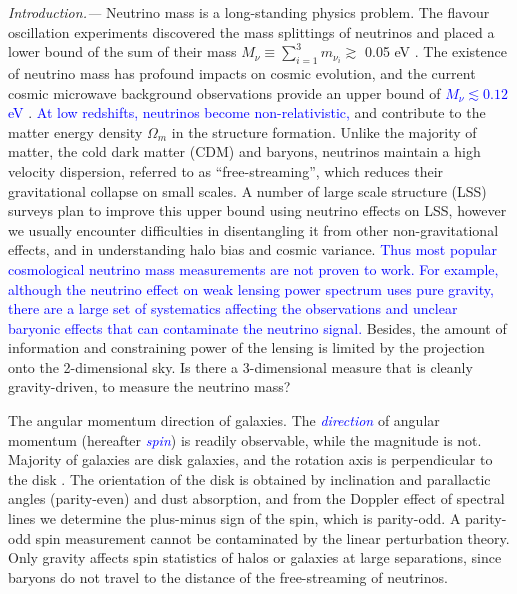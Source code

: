 \documentclass[aps,prd,twocolumn,amsmath,amssymb,amsfont,superscriptaddress,nofootinbib]{revtex4-1}
\newcommand{\tcb}{\textcolor{blue}}
\begin{document}
\textit{Introduction.---}
Neutrino mass is a long-standing physics problem. 
The flavour oscillation experiments \citep{2002PhRvL..89a1301A} discovered the mass 
splittings of neutrinos and placed a lower bound of the sum of their mass 
$M_\nu \equiv \sum_{i=1}^3 m_{\nu_i} \gtrsim$ 0.05 eV \citep{2014ChPhC..38i0001O}. 
The existence of neutrino mass has profound impacts on cosmic evolution, and the current cosmic microwave background observations provide an 
upper bound of \tcb{ $M_\nu\lesssim 0.12$ eV \citep{2018arXiv180706209P}}. 
\tcb{At low redshifts, neutrinos become non-relativistic,} 
and contribute to the matter energy density $\Omega_m$ in the structure formation. 
Unlike the majority of matter, the cold dark matter (CDM) and baryons, 
neutrinos maintain a high velocity dispersion, 
referred to as ``free-streaming'', which reduces their gravitational collapse on small scales. 
A number of large scale structure (LSS) surveys \citep{2011arXiv1110.3193L,2015AAS...22533605E}
plan to improve this upper bound using neutrino effects on LSS,
however we usually encounter difficulties in disentangling it from other non-gravitational effects, 
and in understanding halo bias and cosmic variance. 
\tcb{Thus most popular cosmological neutrino mass measurements are not proven to work.
For example, although the neutrino effect on weak lensing power spectrum \citep{2011arXiv1110.3193L} uses pure gravity, 
there are a large set of systematics affecting the observations and unclear baryonic effects that can contaminate the neutrino signal.}
Besides, the amount of information and constraining power of the lensing is limited by the projection onto the 2-dimensional sky. 
Is there a 3-dimensional measure that is cleanly gravity-driven, to measure the neutrino mass?




The angular momentum direction of galaxies. 
The \tcb{\it direction} of angular momentum (hereafter \tcb{\it spin}) is readily observable, while the magnitude is not. 
Majority of galaxies are disk galaxies, and the rotation axis is perpendicular to the disk \citep{1998MNRAS.297L..71M}. 
The orientation of the disk is obtained by inclination and parallactic angles (parity-even) and dust absorption, and from the Doppler effect of spectral lines we determine the plus-minus sign of the spin, which is parity-odd.
A parity-odd spin measurement cannot be contaminated by the linear perturbation theory. 
Only gravity affects spin statistics of halos or galaxies at large separations, since baryons do not travel to the distance of the free-streaming of neutrinos.
\end{document}
